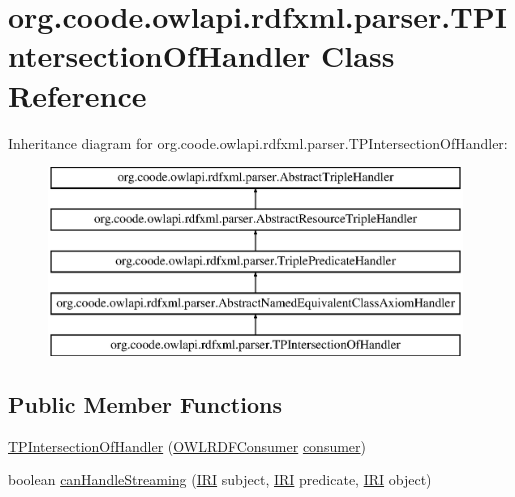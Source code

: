 \hypertarget{classorg_1_1coode_1_1owlapi_1_1rdfxml_1_1parser_1_1_t_p_intersection_of_handler}{\section{org.\-coode.\-owlapi.\-rdfxml.\-parser.\-T\-P\-Intersection\-Of\-Handler Class Reference}
\label{classorg_1_1coode_1_1owlapi_1_1rdfxml_1_1parser_1_1_t_p_intersection_of_handler}
}
Inheritance diagram for org.\-coode.\-owlapi.\-rdfxml.\-parser.\-T\-P\-Intersection\-Of\-Handler\-:\begin{figure}[H]
\begin{center}
\leavevmode
\includegraphics[height=5.000000cm]{classorg_1_1coode_1_1owlapi_1_1rdfxml_1_1parser_1_1_t_p_intersection_of_handler}
\end{center}
\end{figure}
\subsection*{Public Member Functions}
\begin{DoxyCompactItemize}
\item 
\hyperlink{classorg_1_1coode_1_1owlapi_1_1rdfxml_1_1parser_1_1_t_p_intersection_of_handler_abcf9178c8e058cba8d2ffaa314676e09}{T\-P\-Intersection\-Of\-Handler} (\hyperlink{classorg_1_1coode_1_1owlapi_1_1rdfxml_1_1parser_1_1_o_w_l_r_d_f_consumer}{O\-W\-L\-R\-D\-F\-Consumer} \hyperlink{classorg_1_1coode_1_1owlapi_1_1rdfxml_1_1parser_1_1_abstract_triple_handler_a4ccf4d898ff01eb1cadfa04b23d54e9c}{consumer})
\item 
boolean \hyperlink{classorg_1_1coode_1_1owlapi_1_1rdfxml_1_1parser_1_1_t_p_intersection_of_handler_ae817df522cf8a556c1bd1b776e94a796}{can\-Handle\-Streaming} (\hyperlink{classorg_1_1semanticweb_1_1owlapi_1_1model_1_1_i_r_i}{I\-R\-I} subject, \hyperlink{classorg_1_1semanticweb_1_1owlapi_1_1model_1_1_i_r_i}{I\-R\-I} predicate, \hyperlink{classorg_1_1semanticweb_1_1owlapi_1_1model_1_1_i_r_i}{I\-R\-I} object)
\end{DoxyCompactItemize}
